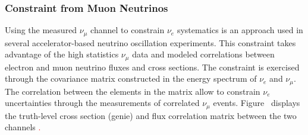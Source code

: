 \documentclass[a4paper]{article}
\begin{document}
\subsubsection{Constraint from Muon Neutrinos}
\label{subsec:constraintfromnumu}
Using the measured $\nu_{\mu}$ channel to constrain $\nu_e$ systematics is an approach used in several accelerator-based neutrino oscillation experiments. 
This constraint takes advantage of the high statistics $\nu_{\mu}$ data and modeled correlations between electron and muon neutrino fluxes and cross sections. 
The constraint is exercised through the covariance matrix constructed in the energy spectrum of $\nu_e$ and $\nu_{\mu}$. 
The correlation between the elements in the matrix allow to constrain $\nu_e$ uncertainties through the measurements of correlated $\nu_{\mu}$ events. 
Figure~\cite{fig:numuconstrainttruth} displays the truth-level cross section (genie) and flux correlation matrix between the two channels \textcolor{red}. 

{}
\end{document}
